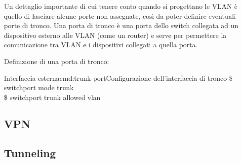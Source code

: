 Un dettaglio importante di cui tenere conto quando si progettano le VLAN è quello di lasciare alcune porte non assegnate, così da poter definire eventuali porte di tronco. Una porta di tronco è una porta dello switch collegata ad un dispositivo esterno alle VLAN (come un router) e serve per permettere la comunicazione tra VLAN e i dispositivi collegati a quella porta.

Definizione di una porta di tronco:

\begin{cmds}[Switch]{Interfaccia esterna}{cmd:trunk-port}{Configurazione dell'interfaccia di tronco}
    \$ switchport mode trunk\\
    \$ switchport trunk allowed vlan
\end{cmds}

\subsection{VPN}
\subsection{Tunneling}